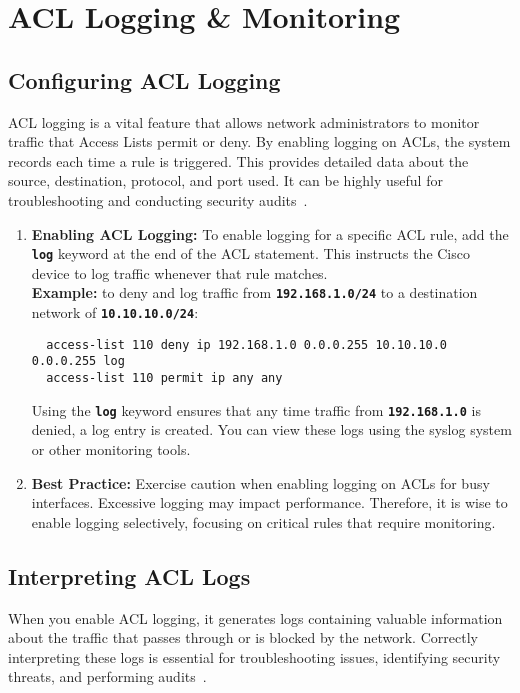\documentclass[11pt,a4paper]{article}
\begin{document}
\section*{ACL Logging \& Monitoring}
            \subsection*{Configuring ACL Logging}
            ACL logging is a vital feature that allows network administrators to monitor traffic that Access Lists permit or deny. By enabling logging on ACLs, the system records each time a rule is triggered. This provides detailed data about the source, destination, protocol, and port used. It can be highly useful for troubleshooting and conducting security audits~\cite{ACL-Logging}.

            \begin{enumerate}
                \item \textbf{Enabling ACL Logging:} To enable logging for a specific ACL rule, add the \textbf{\lstinline{log}} keyword at the end of the ACL statement. This instructs the Cisco device to log traffic whenever that rule matches.
                \\[1em]
                \textbf{Example:} to deny and log traffic from \textbf{\lstinline{192.168.1.0/24}} to a destination network of \textbf{\lstinline{10.10.10.0/24}}:
\begin{lstlisting}
  access-list 110 deny ip 192.168.1.0 0.0.0.255 10.10.10.0 0.0.0.255 log
  access-list 110 permit ip any any                                                                                              
\end{lstlisting}
                Using the \textbf{\lstinline{log}} keyword ensures that any time traffic from \textbf{\lstinline{192.168.1.0}} is denied, a log entry is created. You can view these logs using the syslog system or other monitoring tools.


                \item \textbf{Best Practice:} Exercise caution when enabling logging on ACLs for busy interfaces. Excessive logging may impact performance. Therefore, it is wise to enable logging selectively, focusing on critical rules that require monitoring.

            \end{enumerate}
    \subsection*{Interpreting ACL Logs}
        When you enable ACL logging, it generates logs containing valuable information about the traffic that passes through or is blocked by the network. Correctly interpreting these logs is essential for troubleshooting issues, identifying security threats, and performing audits~\cite{Interpreting-ACL-Logs}.
\end{document}
